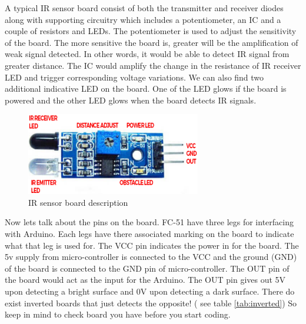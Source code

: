 \par A typical \ac{IR} sensor board consist of both the transmitter and receiver diodes along with supporting circuitry which includes a potentiometer, an \ac{IC} and a couple of resistors and LEDs. The potentiometer is used to adjust the sensitivity of the board. The more sensitive the board is, greater will be the amplification of weak signal detected. In other words, it would be able to detect \ac{IR} signal from greater distance. The \ac{IC} would amplify the change in the resistance of \ac{IR} receiver LED and trigger corresponding voltage variations. We can also find two additional indicative LED on the board. One of the LED glows if the board is powered and the other LED glows when the board detects \ac{IR} signals.

\begin{figure}[h!]	
	\centering
	\includegraphics[width=3in]{Images/IR Sensor/IR_board_desp.png}
	\caption{\ac{IR} sensor board description}
\end{figure}

 Now lets talk about the pins on the board. FC-51 have three legs for interfacing with Arduino. Each legs have there associated marking on the board to indicate what that leg is used for. The VCC pin indicates the power in for the board. The 5v supply from micro-controller is connected to the VCC and the ground (GND) of the board is connected to the GND pin of micro-controller. The OUT pin of the board would act as the input for the Arduino. The OUT pin gives out 5V upon detecting a bright surface and 0V upon detecting a dark surface. There do exist inverted boards that just detects the opposite! ( see table \ref{tab:inverted}) So keep in mind to check board you have before you start coding. 

